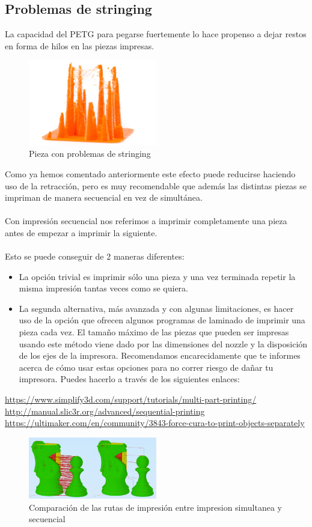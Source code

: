 \documentclass[11pt,a4paper]{article}
\begin{document}
	\subsection{Problemas de stringing}La capacidad del PETG para pegarse fuertemente lo hace propenso a dejar restos en forma de hilos en las piezas impresas.
\begin{figure}[H]
\centering
\includegraphics[width=0.5\textwidth,cfbox=azul_marcos 1pt 0pt]{FOTOS/RETRACCION1}
\caption*{Pieza con problemas de stringing}
\end{figure}
Como ya hemos comentado anteriormente este efecto puede reducirse haciendo uso de la retracción, pero es muy recomendable que además las distintas piezas se impriman de manera secuencial en vez de simultánea.
\\\\
Con impresión secuencial nos referimos a imprimir completamente una pieza antes de empezar a imprimir la siguiente.
\\\\
Esto se puede conseguir de 2 maneras diferentes:
\begin{itemize}
\item La opción trivial es imprimir sólo una pieza y una vez terminada repetir la misma impresión tantas veces como se quiera.
\item La segunda alternativa, más avanzada y con algunas limitaciones, es hacer uso de la opción que ofrecen algunos programas de laminado de imprimir una pieza cada vez. El tamaño máximo de las piezas que pueden ser impresas usando este método viene dado por las dimensiones del nozzle y la disposición de los ejes de la impresora. Recomendamos encarecidamente que te informes acerca de cómo usar estas opciones para no correr riesgo de dañar tu impresora. Puedes hacerlo a través de los siguientes enlaces:
\end{itemize}
\url{https://www.simplify3d.com/support/tutorials/multi-part-printing/}\\
\url{http://manual.slic3r.org/advanced/sequential-printing}\\
\url{https://ultimaker.com/en/community/3843-force-cura-to-print-objects-separately}
\begin{figure}[H]
\centering
\includegraphics[width=0.5\textwidth,cfbox=azul_marcos 4pt 0pt]{FOTOS/SEQUENTIALPRINTING}
\caption*{Comparación de las rutas de impresión entre impresion simultanea y secuencial}
\end{figure}
\end{document}
